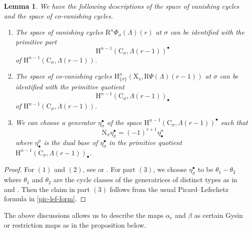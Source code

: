 \documentclass[10pt]{amsart}
\numberwithin{equation}{section}
\newtheorem{lemma}[equation]{Lemma}
\theoremstyle{definition}
\def\rmc{\mathrm{c}}
\def\rmC{\mathrm{C}}
\def\rmH{\mathrm{H}}
\def\rmR{\mathrm{R}}
\def\rmX{\mathrm{X}}
\begin{document}
\begin{lemma} \label{intersection}
We have the following descriptions of the space of vanishing cycles and the space of co-vanishing cycles.
\begin{enumerate}
\item The space of vanishing cycles $\rmR^{n}\Phi_{\sigma}(\Lambda)(r)$ at $\sigma$ can be identified with the primitive part  
\begin{equation*}
\rmH^{n-1}(\rmC_{\sigma}, \Lambda(r-1))^{\bullet} 
\end{equation*}
of $\rmH^{n-1}(\rmC_{\sigma}, \Lambda(r-1))$.
\item The space of co-vanishing cycles $\rmH^{n}_{\{\sigma\}}(\rmX_{\overline{s}}, \rmR\Psi(\Lambda)(r-1))$ at $\sigma$ can be identified with the primitive quotient 
\begin{equation*}
\rmH^{n-1}(\rmC_{\sigma}, \Lambda(r-1))_{\bullet} 
\end{equation*}
of $\rmH^{n-1}(\rmC_{\sigma}, \Lambda(r-1))$.
\item We can choose a generator $\eta^{\bullet}_{\sigma}$ of the space $\rmH^{n-1}(\rmC_{\sigma}, \Lambda(r-1))^{\bullet}$  such that 
\begin{equation*}
\mathrm{N}_{\sigma}\eta^{\bullet}_{\sigma}=(-1)^{r+1}\eta^{\sigma}_{\bullet} 
\end{equation*}
where $\eta^{\sigma}_{\bullet}$ is the dual base of   $\eta^{\bullet}_{\sigma}$ in the primitive quotient $\rmH^{n-1}(\rmC_{\sigma}, \Lambda(r-1))_{\bullet} $.
\end{enumerate}
\end{lemma}
\begin{proof}
For $(1)$ and $(2)$, see \cite[2.2.5 F Expose XV]{SGA7} or \cite[Remarks 2.7]{Illusie-van}.  For part $(3)$, we choose $\eta^{\bullet}_{\sigma}$ to be $\theta_{1}-\theta_{2}$ where $\theta_{1}$ and $\theta_{2}$ are the cycle classes of the generatrices of distinct types as in \cite[ Expose XII 3.5]{SGA7} and \cite[3.2]{Illusie-van}. Then the claim in part $(3)$ follows from the usual Picard--Lefschetz formula in \ref{pic-lef-form}. 
\end{proof}

The above discussions allows us to describe the maps $\alpha_{\rmc}$ and $\beta$ as certain Gysin or restriction maps as in the proposition below.
\end{document}
